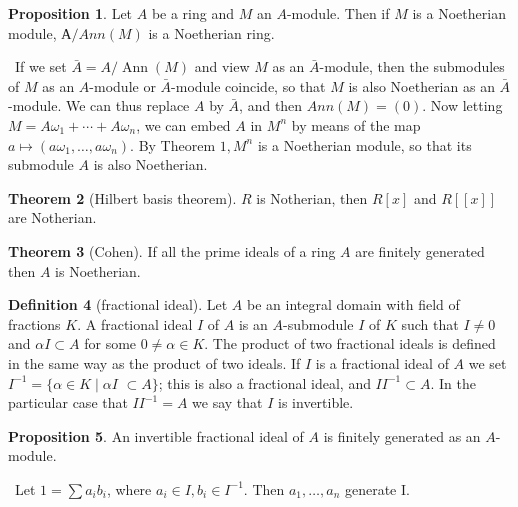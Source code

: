 \documentclass[a4paper,12pt]{article}
\newenvironment{prooff}{{\noindent\it\textcolor{cyan!40!black}{Proof}:}\,}{\par}
\theoremstyle{definition}
\newtheorem{defn}{Definition}[subsection]
\newtheorem{theo}[defn]{Theorem}
\newtheorem{prop}[defn]{Proposition}
\begin{document}
\begin{prop}
    Let $A$ be a ring and $M$ an $A$-module. Then if $M$ is a
    Noetherian module, $А/Ann(M)$ is a Noetherian ring.
\end{prop}
\begin{prooff}
    If we set $\bar{A}=A / \operatorname{Ann}(M)$ and view $M$ as an $\bar{A}$-module, then the submodules of $M$ as an $A$-module or $\bar{A}$-module coincide, so that $M$ is also Noetherian as an $\bar{A}$-module. We can thus replace $A$ by $\bar{A}$, and then $Ann(M)=(0)$. Now letting $M=A \omega_1+\cdots+A \omega_n$, we can embed $A$ in $M^n$ by means of the map $a \mapsto\left(a \omega_1, \ldots, a \omega_n\right)$. By Theorem $1, M^n$ is a Noetherian module, so that its submodule $A$ is also Noetherian.
\end{prooff}
\begin{theo}[Hilbert basis theorem]
    $R$ is Notherian, then $R[x]$ and $R[[x]]$ are Notherian.
\end{theo}
\begin{theo}[Cohen]
    If all the prime ideals of a ring $A$ are finitely
    generated then $A$ is Noetherian.
\end{theo}
\begin{defn}[fractional ideal]
    Let $A$ be an integral domain with field of fractions $K$. A fractional ideal $I$ of $A$ is an $A$-submodule $I$ of $K$ such that $I \neq 0$ and $\alpha I \subset A$ for some $0 \neq \alpha \in K$. The product of two fractional ideals is defined in the same way as the product of two ideals. If $I$ is a fractional ideal of $A$ we set $I^{-1}=\{\alpha \in K \mid \alpha I$ $\subset A\}$; this is also a fractional ideal, and $I I^{-1} \subset A$. In the particular case that $I I^{-1}=A$ we say that $I$ is invertible.
\end{defn}
\begin{prop}
    An invertible fractional ideal of $A$ is finitely generated as an $A$-module.
\end{prop}
\begin{prooff}
    Let $1=\sum a_ib_i$, where $a_i\in I, b_i\in I^{-1}$. Then $a_1,\dots,a_n$ generate I.
\end{prooff}




\newpage
\end{document}
